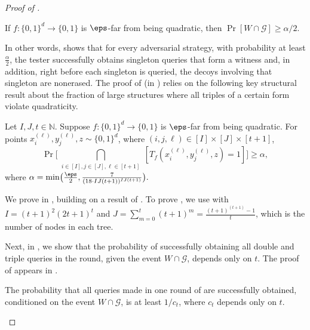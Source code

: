 \documentclass{toc}
\begin{document}
\begin{proof}[Proof of ]
 \begin{lemma}\label{lem:witness} If $f\colon \{0,1\}^d\to\{0,1\}$ is $\eps$-far from being quadratic, then $\Pr[W \cap \mathcal{G}] \geq \alpha/2$. 
\end{lemma}

 
In other words,  shows that for every adversarial strategy, with probability at least  $\frac{\alpha}{2}$,  the tester successfully obtains singleton queries that form a witness and, in addition, right before each singleton is queried, the decoys involving that singleton are nonerased. The proof of  (in ) relies on the following key structural result about the fraction of large structures where all triples of a certain form violate quadraticity. %
 
\begin{lemma}\label{lem:quadratic_t}
    Let $I,J,t\in{\mathbb{N}}$.
	Suppose $f \colon \{0,1\}^d\to \{0,1\}$ is $\eps$-far from being quadratic. For points $x_i^{(\ell)}, y_{j}^{(\ell)}, z \sim \{0,1\}^d$, where $(i,j,\ell) \in [I]\times[J]\times[t+1]$,
 	\begin{equation}\label{eq:violation}
 	    	\Pr\biggl[ \bigcap_{\substack{i \in [I], j\in [J], \ell \in [t+1]}} [T_f(x_i^{(\ell)}, y_{j}^{(\ell)}, z) = 1] \biggr] \geq \alpha, 
 	\end{equation}
 	where $\alpha= \min \bigl( \frac{\eps}{2}, \frac{7}{(18 \cdot IJ(t+1))^{I J (t+1)}} \bigr).$
\end{lemma}



We prove  in , building on a result of \cite{AlonKKLR05}. To prove , we use  with $I = (t+1)^2(2t+1)^t$ and $J = \sum_{m=0}^{t}(t+1)^m = \frac{(t+1)^{(t+1)}-1}{t}$, which is the number of nodes in each tree. 



Next, in , we show that the probability of successfully obtaining all double and triple queries in the round, given the event $W\cap \mathcal{G}$, depends only on $t$. The proof of  appears in  .
 \begin{lemma}\label{lem:erasures}
The probability that all queries made in one round of  are successfully obtained, conditioned on the event $W \cap \mathcal{G}$, is at least $1/c_t$, where $c_t$ depends only on $t$.
\end{lemma}


\end{proof}
\end{document}
